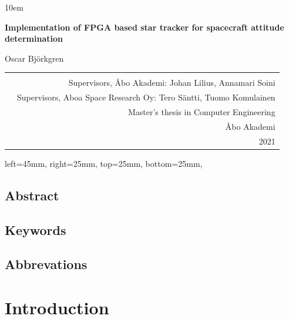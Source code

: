 \documentclass[12pt]{report}
\begin{document}
\emergencystretch 10em
\begin{titlepage}
\begin{center}
        \vspace*{5cm}
        
        \LARGE
        \textbf{Implementation of FPGA based star tracker for spacecraft attitude determination}
        \\
        \vspace{0.5cm}
        
        Oscar Björkgren
        
\end{center}
\vspace{8cm}
\begin{tabular}{l r }
\multirow{4}{10em}{
} \\
\multirow{12}{1em}{
} &

Supervisors, Åbo Akademi: Johan Lilius, Annamari Soini\\ &
Supervisors, Aboa Space Research Oy: Tero Säntti, Tuomo Komulainen\\ & 
Master's thesis in Computer Engineering\\ &
Åbo Akademi\\ &
2021

\end{tabular}

\flushright
\end{titlepage}
\newgeometry
{
 left=45mm,
 right=25mm,
 top=25mm,
 bottom=25mm,
}
\section*{Abstract}
\section*{Keywords}
\section*{Abbrevations}

\tableofcontents
\listoffigures

\chapter{Introduction}
\end{document}
